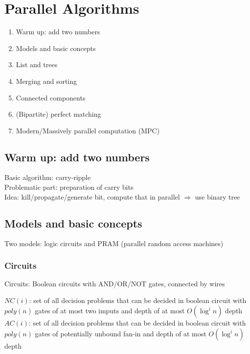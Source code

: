 \section{Parallel Algorithms}

\begin{tcolorbox}[title=Sections, colback=blue!10, colframe=blue]
    \begin{enumerate}
        \item Warm up: add two numbers
        \item Models and basic concepts
        \item List and trees
        \item Merging and sorting
        \item Connected components
        \item (Bipartite) perfect matching
        \item Modern/Massively parallel computation (MPC)
    \end{enumerate}
\end{tcolorbox}

\subsection{Warm up: add two numbers}

Basic algorithm: carry-ripple \\
Problematic part: preparation of carry bits \\
Idea: kill/propagate/generate bit, compute that in parallel $\Rightarrow$ use binary tree

\subsection{Models and basic concepts}

Two models: logic circuits and PRAM (parallel random access machines)

\subsubsection{Circuits}
Circuits: Boolean circuits with AND/OR/NOT gates, connected by wires 

$NC(i)$: set of all decision problems that can be decided in boolean circuit with $poly(n)$ gates of at most two imputs and depth of at most $O(\log^i n)$ depth \\
$AC(i)$: set of all decision problems that can be decided in boolean circuit with $poly(n)$ gates of potentially unbound fan-in and depth of at most $O(\log^i n)$ depth

